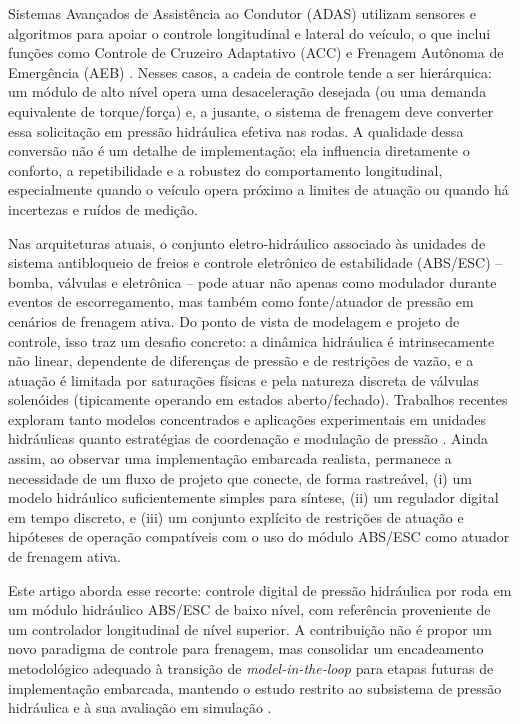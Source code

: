 \documentclass[a4paper]{ifacconf}
\begin{document}
Sistemas Avançados de Assistência ao Condutor (ADAS) utilizam sensores e algoritmos para apoiar o controle longitudinal e lateral do veículo, o que inclui funções como Controle de Cruzeiro Adaptativo (ACC) e Frenagem Autônoma de Emergência (AEB) \cite{Lentin2022}. Nesses casos, a cadeia de controle tende a ser hierárquica: um módulo de alto nível opera uma desaceleração desejada (ou uma demanda equivalente de torque/força) e, a jusante, o sistema de frenagem deve converter essa solicitação em pressão hidráulica efetiva nas rodas. A qualidade dessa conversão não é um detalhe de implementação; ela influencia diretamente o conforto, a repetibilidade e a robustez do comportamento longitudinal, especialmente quando o veículo opera próximo a limites de atuação ou quando há incertezas e ruídos de medição.

Nas arquiteturas atuais, o conjunto eletro-hidráulico associado às unidades de sistema antibloqueio de freios e controle eletrônico de estabilidade (ABS/ESC) -- bomba, válvulas e eletrônica -- pode atuar não apenas como modulador durante eventos de escorregamento, mas também como fonte/atuador de pressão em cenários de frenagem ativa. Do ponto de vista de modelagem e projeto de controle, isso traz um desafio concreto: a dinâmica hidráulica é intrinsecamente não linear, dependente de diferenças de pressão e de restrições de vazão, e a atuação é limitada por saturações físicas e pela natureza discreta de válvulas solenóides (tipicamente operando em estados aberto/fechado). Trabalhos recentes exploram tanto modelos concentrados e aplicações experimentais em unidades hidráulicas \cite{HouhuaJing2022,Quan2022,Roxana2021,Dankan2020,Kosicky2022} quanto estratégias de coordenação e modulação de pressão \cite{Lv2014,ChenLv2017,PressureCoordinatedControl2023,Tian2024}. Ainda assim, ao observar uma implementação embarcada realista, permanece a necessidade de um fluxo de projeto que conecte, de forma rastreável, (i) um modelo hidráulico suficientemente simples para síntese, (ii) um regulador digital em tempo discreto, e (iii) um conjunto explícito de restrições de atuação e hipóteses de operação compatíveis com o uso do módulo ABS/ESC como atuador de frenagem ativa.

Este artigo aborda esse recorte: controle digital de pressão hidráulica por roda em um módulo hidráulico ABS/ESC de baixo nível, com referência proveniente de um controlador longitudinal de nível superior. A contribuição não é propor um novo paradigma de controle para frenagem, mas consolidar um encadeamento metodológico adequado à transição de \textit{model-in-the-loop} para etapas futuras de implementação embarcada, mantendo o estudo restrito ao subsistema de pressão hidráulica e à sua avaliação em simulação \cite{KapinskiJamesDeshmukh2016}.
\end{document}
